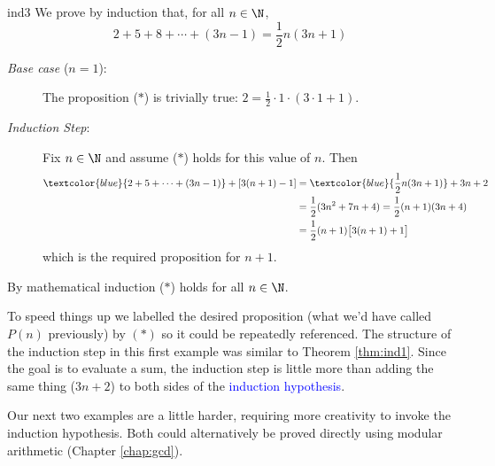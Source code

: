 \begin{example}{}{ind3}
	We prove by induction that, for all $n\in\N$,
	\[
		2+5+8+\cdots+(3n-1)=\frac 12n(3n+1) \tag{$\ast$}
	\]
	\begin{description}
		\item[\normalfont\emph{Base case} ($n=1$):] The proposition ($\ast$) is trivially true: $2=\frac 12\cdot 1\cdot(3\cdot 1+1)$.
		\item[\normalfont\emph{Induction Step}:] Fix $n\in\N$ and assume ($\ast$) holds for this value of $n$. Then
		\begin{align*}
			\textcolor{blue}{2+5+\cdots+(3n-1)}+[3(n+1)-1]&=\textcolor{blue}{\frac 12n(3n+1)}+3n+2\\
			&=\frac 12(3n^2+7n+4) =\frac 12(n+1)(3n+4)\\
			&=\frac 12(n+1)\bigl[3(n+1)+1\bigr]
		\end{align*}
		which is the required proposition for $n+1$.
	\end{description}
	By mathematical induction ($\ast$) holds for all $n\in\N$.
\end{example}

To speed things up we labelled the desired proposition (what we'd have called $P(n)$ previously) by $(\ast)$ so it could be repeatedly referenced. The structure of the induction step in this first example was similar to Theorem \ref{thm:ind1}. Since the goal is to evaluate a sum, the induction step is little more than adding the same thing ($3n+2$) to both sides of the \textcolor{blue}{induction hypothesis}.\medbreak\goodbreak

Our next two examples are a little harder, requiring more creativity to invoke the induction hypothesis. Both could alternatively be proved directly using modular arithmetic (Chapter \ref{chap:gcd}).

